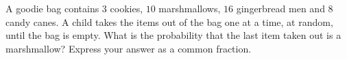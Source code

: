 A goodie bag contains $3$ cookies, $10$ marshmallows, $16$ gingerbread men and $8$ candy canes. A child takes the items out of the bag one at a time, at random, until the bag is empty. What is the probability that the last item taken out is a marshmallow? Express your answer as a common fraction.
